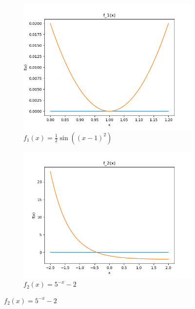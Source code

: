 \documentclass[a4paper,12pt]{article}
\begin{document}
\begin{figure}[H]
    \centering
	\begin{subfigure}[b]{0.49\textwidth}
	    \centering
	    \includegraphics[width=\textwidth]{img/report1/f1.png}
	    \caption{$f_1(x) = \frac{1}{2}\sin((x - 1)^2)$}
	    \label{fig:0}
	\end{subfigure}
	\hfill
	\begin{subfigure}[b]{0.49\textwidth}
	    \centering
	     \includegraphics[width=\textwidth]{img/report1/f2.png}
	     \caption{$f_2(x) = 5^{-x} - 2$}
	     \label{fig:1}
	\end{subfigure}
\end{figure}
\end{document}
